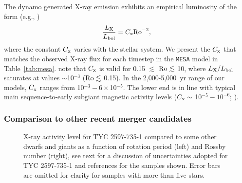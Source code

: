 \documentclass[linenumbers]{aastex631}
\begin{document}
The dynamo generated X-ray emission exhibits an empirical luminosity of the form  (e.g., \citealt{Soker&Tylenda2007})
\begin{equation}
\frac{L_{\rm X}}{L_{\rm bol}} = C_{\rm x}{\rm Ro}^{-2}, \label{eqn:cx}
\end{equation}
where the constant $C_{\rm x}$ varies with the stellar system. We present the $C_{\rm x}$ that matches the observed X-ray flux for each timestep in the \texttt{MESA} model in Table~\ref{tab:mesa}. \citet{Soker&Tylenda2007} note that $C_{\rm x}$ is valid for 0.15 $\lesssim$ ${\rm Ro} \lesssim$ 10, where $L_{\rm X} / L_{\rm bol}$ saturates at values $\sim$10$^{-3}$ (${\rm Ro} \lesssim$ 0.15). In the 2,000-5,000~yr range of our models, $C_{\rm x}$ ranges from 10$^{-3} - 6\times$10$^{-5}$. The lower end is in line with typical main sequence-to-early subgiant magnetic activity levels ($C_{\rm x} \sim$ 10$^{-5}-10^{-6}$; \citealt{Pizzolato+2003, Gondoin+2005}).




\subsubsection{Comparison to other recent merger candidates}
\label{sect:comparison}
\begin{figure}
    \caption{X-ray activity level for TYC 2597-735-1 compared to some other dwarfs and giants as a function of rotation period (left) and Rossby number (right), see text for a discussion of uncertainties adopted for TYC 2597-735-1 and references for the samples shown. Error bars are omitted for clarity for samples with more than five stars.
    \label{fig:lxbol}}
\end{figure}
\end{document}
